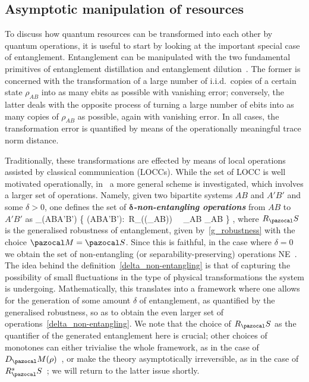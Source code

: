 \documentclass[11pt,notitlepage,tightenlines,nofootinbib,superscriptaddress]{revtex4-1}
\newcommand{\deff}[1]{\textbf{\emph{#1}}}
\begin{document}

\subsection{Asymptotic manipulation of resources}\label{sec:asymp_manipulation}

To discuss how quantum resources can be transformed into each other by quantum operations, it is useful to start by looking at the important special case of entanglement. Entanglement can be manipulated with the two fundamental primitives of entanglement distillation and entanglement dilution~\cite{Bennett-distillation, Bennett-distillation-mixed, Bennett-error-correction}. The former is concerned with the transformation of a large number of i.i.d.\ copies of a certain state $\rho_{AB}$ into as many ebits as possible with vanishing error; conversely, the latter deals with the opposite process of turning a large number of ebits into as many copies of $\rho_{AB}$ as possible, again with vanishing error. In all cases, the transformation error is quantified by means of the operationally meaningful trace norm distance.

Traditionally, these transformations are effected by means of local operations assisted by classical communication (LOCCs). While the set of LOCC is well motivated operationally, in~\cite{BrandaoPlenio1, BrandaoPlenio2} a more general scheme is investigated, which involves a larger set of operations. Namely, given two bipartite systems $AB$ and $A'B'$ and some $\delta>0$, one defines the set of \deff{$\boldsymbol{\delta}$-non-entangling operations} from $AB$ to $A'B'$ as
\bb
\sepp_\delta \left(AB\to A'B'\right) \coloneqq \left\{ \Lambda\in \cptp\left(AB\to A'B'\right):\ R_\SEP\left(\Lambda(\sigma_{AB})\right) \leq \delta \ \ \forall \sigma_{AB} \in \SEP_{AB} \right\} ,
\label{delta_non-entangling}
\ee
where $R_\SEP$ is the generalised robustness of entanglement, given by~\eqref{g_robustness} with the choice $\MM=\SEP$. Since this is faithful, in the case where $\delta=0$ we obtain the set of non-entangling (or separability-preserving) operations NE~\cite{BrandaoPlenio1, BrandaoPlenio2}. 
The idea behind the definition~\eqref{delta_non-entangling} is that of %
capturing the possibility of small fluctuations in the type of physical transformations the system is undergoing. Mathematically, this translates into a framework where one allows
for the generation of some amount $\delta$ of entanglement, as quantified by the generalised robustness, so as to obtain the even larger set of operations~\eqref{delta_non-entangling}. We note that the choice of $R_\SEP$ as the quantifier of the generated entanglement here is crucial; other choices of monotones can either trivialise the whole framework, as in the case of $D_\MM(\rho)$~\cite[Sec.~V]{BrandaoPlenio2}, or make the theory asymptotically irreversible, as in the case of $R^s_\SEP$~\cite{irreversibility}; we will return to the latter issue shortly.
\end{document}
